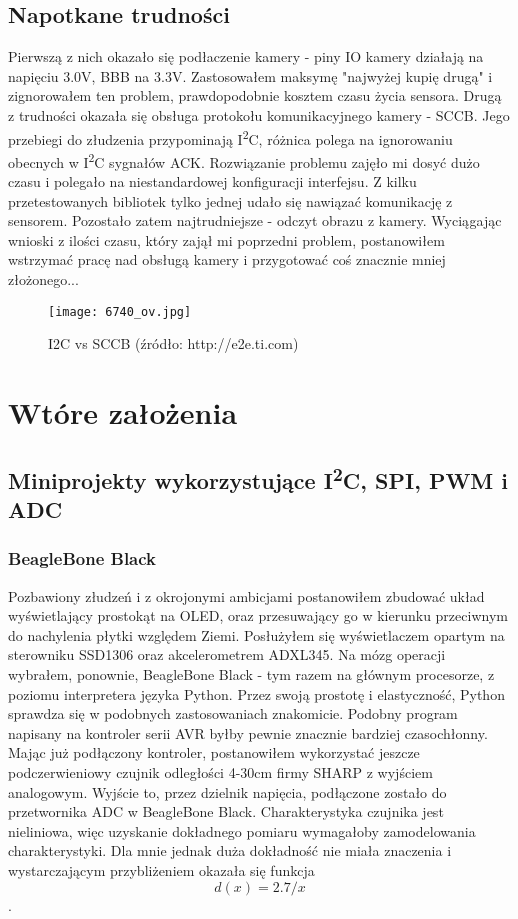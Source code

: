 \documentclass[a4paper]{article}
\begin{document}
\subsection{Napotkane trudności}
Pierwszą z nich okazało się podłaczenie kamery - piny IO kamery działają na napięciu 3.0V, BBB na 3.3V. Zastosowałem maksymę "najwyżej kupię drugą" i zignorowałem ten problem, prawdopodobnie kosztem czasu życia sensora. Drugą z trudności okazała się obsługa protokołu komunikacyjnego kamery - SCCB. Jego przebiegi do złudzenia przypominają I\textsuperscript{2}C, różnica polega na ignorowaniu obecnych w I\textsuperscript{2}C sygnałów ACK. Rozwiązanie problemu zajęło mi dosyć dużo czasu i polegało na niestandardowej konfiguracji interfejsu. Z kilku przetestowanych bibliotek tylko jednej udało się nawiązać komunikację z sensorem. Pozostało zatem najtrudniejsze - odczyt obrazu z kamery. Wyciągając wnioski z ilości czasu, który zajął mi poprzedni problem, postanowiłem wstrzymać pracę nad obsługą kamery i przygotować coś znacznie mniej złożonego...
\begin{figure}
    \centering
    \texttt{[image: 6740\_ov.jpg]}
    \caption{I2C vs SCCB (źródło: http://e2e.ti.com)}
\end{figure}
\section{Wtóre założenia}
\subsection{Miniprojekty wykorzystujące I\textsuperscript{2}C, SPI, PWM i ADC}
\subsubsection{BeagleBone Black}
Pozbawiony złudzeń i z okrojonymi ambicjami postanowiłem zbudować układ wyświetlający prostokąt na OLED, oraz przesuwający go w kierunku przeciwnym do nachylenia płytki względem Ziemi. Posłużyłem się wyświetlaczem opartym na sterowniku SSD1306 oraz akcelerometrem ADXL345. Na mózg operacji wybrałem, ponownie, BeagleBone Black - tym razem na głównym procesorze, z poziomu interpretera języka Python. Przez swoją prostotę i elastyczność, Python sprawdza się w podobnych zastosowaniach znakomicie. Podobny program napisany na kontroler serii AVR byłby pewnie znacznie bardziej czasochłonny. Mając już podłączony kontroler, postanowiłem wykorzystać jeszcze podczerwieniowy czujnik odległości 4-30cm firmy SHARP z wyjściem analogowym. Wyjście to, przez dzielnik napięcia, podłączone zostało do przetwornika ADC w BeagleBone Black. Charakterystyka czujnika jest nieliniowa, więc uzyskanie dokładnego pomiaru wymagałoby zamodelowania charakterystyki. Dla mnie jednak duża dokładność nie miała znaczenia i wystarczającym przybliżeniem okazała się funkcja \[ d(x) = 2.7/x \]. 
\end{document}
